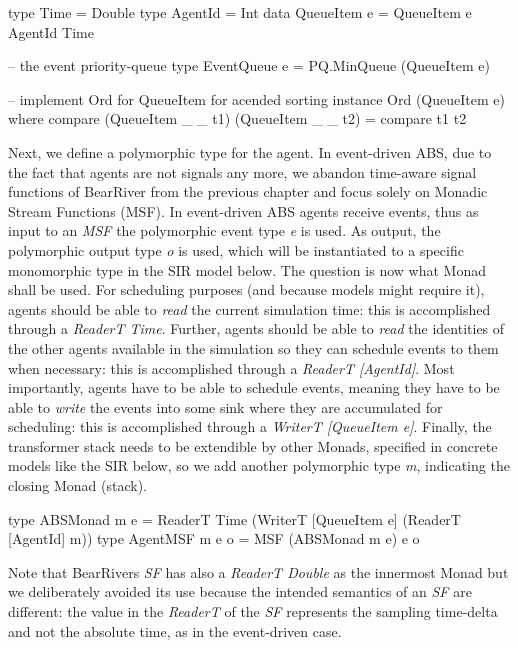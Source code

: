 \begin{HaskellCode}
type Time        = Double
type AgentId     = Int
data QueueItem e = QueueItem e AgentId Time

-- the event priority-queue
type EventQueue e = PQ.MinQueue (QueueItem e)

-- implement Ord for QueueItem for acended sorting
instance Ord (QueueItem e) where
  compare (QueueItem _ _ t1) (QueueItem _ _ t2) = compare t1 t2
\end{HaskellCode}

Next, we define a polymorphic type for the agent. In event-driven ABS, due to the fact that agents are not signals any more, we abandon time-aware signal functions of BearRiver from the previous chapter and focus solely on Monadic Stream Functions (MSF). In event-driven ABS agents receive events, thus as input to an \textit{MSF} the polymorphic event type \textit{e} is used. As output, the polymorphic output type \textit{o} is used, which will be instantiated to a specific monomorphic type in the SIR model below. The question is now what Monad shall be used. For scheduling purposes (and because models might require it), agents should be able to \textit{read} the current simulation time: this is accomplished through a \textit{ReaderT Time}. Further, agents should be able to \textit{read} the identities of the other agents available in the simulation so they can schedule events to them when necessary: this is accomplished through a \textit{ReaderT [AgentId]}. Most importantly, agents have to be able to schedule events, meaning they have to be able to \textit{write} the events into some sink where they are accumulated for scheduling: this is accomplished through a \textit{WriterT [QueueItem e]}. Finally, the transformer stack needs to be extendible by other Monads, specified in concrete models like the SIR below, so we add another polymorphic type \textit{m}, indicating the closing Monad (stack).

\begin{HaskellCode}
type ABSMonad m e   = ReaderT Time (WriterT [QueueItem e] (ReaderT [AgentId] m))
type AgentMSF m e o = MSF (ABSMonad m e) e o
\end{HaskellCode}

Note that BearRivers \textit{SF} has also a \textit{ReaderT Double} as the innermost Monad but we deliberately avoided its use because the intended semantics of an \textit{SF} are different: the value in the \textit{ReaderT} of the \textit{SF} represents the sampling time-delta and not the absolute time, as in the event-driven case.

